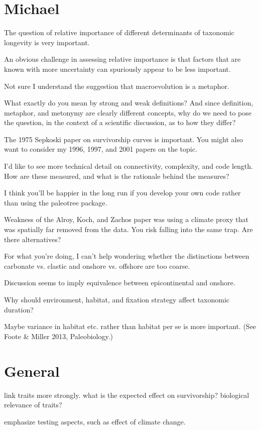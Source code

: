 \documentclass[12pt,letterpaper]{article}
\begin{document}
\section*{Michael}
The question of relative importance of different determinants of taxonomic longevity is very important.  

An obvious challenge in assessing relative importance is that factors that are known with more uncertainty can spuriously appear to be less important.

Not sure I understand the suggestion that macroevolution is a metaphor.

What exactly do you mean by strong and weak definitions?  And since definition, metaphor, and metonymy are clearly different concepts, why do we need to pose the question, in the context of a scientific discussion, as to how they differ?

The 1975 Sepkoski paper on survivorship curves is important.  You might also want to consider my 1996, 1997, and 2001 papers on the topic. 

I'd like to see more technical detail on connectivity, complexity, and code length.  How are these measured, and what is the rationale behind the measures?

I think you'll be happier in the long run if you develop your own code rather than using the paleotree package.

Weakness of the Alroy, Koch, and Zachos paper was using a climate proxy that was spatially far removed from the data.  You risk falling into the same trap.  Are there alternatives?

For what you're doing, I can't help wondering whether the distinctions between carbonate vs. clastic and onshore vs. offshore are too coarse.

Discussion seems to imply equivalence between epicontinental and onshore.

Why should environment, habitat, and fixation strategy affect taxonomic duration?

Maybe variance in habitat etc. rather than habitat per se is more important.  (See Foote \& Miller 2013, Paleobiology.)


\section*{General}
link traits more strongly. what is the expected effect on survivorship? biological relevance of traits?

emphasize testing aspects, such as effect of climate change.
\end{document}
